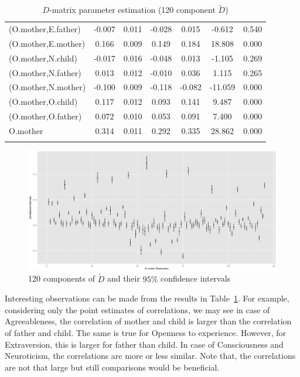 \documentclass[11pt,a5paper,twoside]{book}
\begin{document}
{{\begin{center}
\begin{longtable}{@{\extracolsep{\fill}}lcccccc@{}}
   (O.mother,E.father)  & -0.007 & 0.011 & -0.028 & 0.015 & -0.612 & 0.540 \\ 
   (O.mother,E.mother)  & 0.166 & 0.009 & 0.149 & 0.184 & 18.808 & 0.000 \\ 
   (O.mother,N.child)  & -0.017 & 0.016 & -0.048 & 0.013 & -1.105 & 0.269 \\ 
   (O.mother,N.father)  & 0.013 & 0.012 & -0.010 & 0.036 & 1.115 & 0.265 \\ 
   (O.mother,N.mother)  & -0.100 & 0.009 & -0.118 & -0.082 & -11.059 & 0.000 \\ 
   (O.mother,O.child)  & 0.117 & 0.012 & 0.093 & 0.141 & 9.487 & 0.000 \\ 
   (O.mother,O.father)  & 0.072 & 0.010 & 0.053 & 0.091 & 7.400 & 0.000 \\ 
   O.mother  & 0.314 & 0.011 & 0.292 & 0.335 & 28.862 & 0.000 \\ 
   \hline
   \caption{$D$-matrix parameter estimation (120 component $\tilde{D}$)}
\label{d_est}
\end{longtable}

\end{center}
}}




\begin{figure}
\centering
\includegraphics[width=\textwidth]{d_param.eps}
\caption{120 components of $\tilde{D}$ and their $95\%$ confidence intervals} 
\label{d_ci}
\end{figure} 

Interesting observations can be made from the results in Table~\ref{d_est}. For example, considering only the point estimates of correlations, we may see in case of Agreeableness, the correlation of mother and child is larger than the correlation of father and child. The same is true for Openness to experience. However, for Extraversion, this is larger for father than child. In case of Consciousness and Neuroticism, the correlations are more or less similar. Note that, the correlations are not that large but still comparisons would be beneficial.
\end{document}
